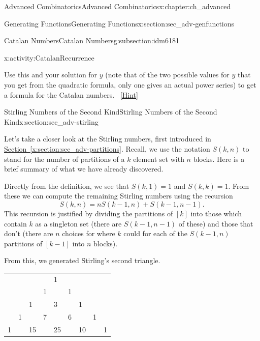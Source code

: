 \documentclass[oneside,10pt,]{book}
\numberwithin{equation}{chapter}
\begin{document}
\begin{chapterptx}{Advanced Combinatorics}{}{Advanced Combinatorics}{}{}{x:chapter:ch_advanced}
\begin{sectionptx}{Generating Functions}{}{Generating Functions}{}{}{x:section:sec_adv-genfunctions}
\begin{subsectionptx}{Catalan Numbers}{}{Catalan Numbers}{}{}{g:subsection:idm6181}
\begin{activity}{}{x:activity:CatalanRecurrence}
\begin{enumerate}[font=\bfseries,label=(\alph*),ref=\alph*]
\begin{equation*}
\end{equation*}
Use this and your solution for \(y\) (note that of the two possible values for \(y\) that you get from the quadratic formula, only one gives an actual power series) to get a formula for the Catalan numbers.%
\qquad~\hfill{\tiny\hyperlink{g:hint:idm6219-back}{[Hint]}}\end{enumerate}
\end{activity}
\end{subsectionptx}
\end{sectionptx}
%
%
\typeout{************************************************}
\typeout{************************************************}
%
\begin{sectionptx}{Stirling Numbers of the Second Kind}{}{Stirling Numbers of the Second Kind}{}{}{x:section:sec_adv-stirling}
\begin{introduction}{}%
Let's take a closer look at the Stirling numbers, first introduced in \hyperref[x:section:sec_adv-partitions]{Section~\ref{x:section:sec_adv-partitions}}.  Recall, we use the notation \(S(k,n)\) to stand for the number of partitions of a \(k\) element set with \(n\) blocks.  Here is a brief summary of what we have already discovered.%
\par
Directly from the definition, we see that \(S(k,1) = 1\) and \(S(k,k) = 1\).  From these we can compute the remaining Stirling numbers using the recursion%
\begin{equation*}
S(k,n) = nS(k-1,n) + S(k-1, n-1).
\end{equation*}
This recursion is justified by dividing the partitions of \([k]\) into those which contain \(k\) as a singleton set (there are \(S(k-1, n-1)\) of these) and those that don't (there are \(n\) choices for where \(k\) could for each of the \(S(k-1, n)\) partitions of \([k-1]\) into \(n\) blocks).%
\par
From this, we generated Stirling's second triangle.%
\begin{sidebyside}{1}{0.25}{0.25}{0}%
\begin{sbspanel}{0.5}%
{\centering%
\begin{tabular}{lllllllll}
&&&&1&&&&\tabularnewline[0pt]
&&&1&&1&&&\tabularnewline[0pt]
&&1&&3&&1&&\tabularnewline[0pt]
&1&&7&&6&&1&\tabularnewline[0pt]
1&&15&&25&&10&&1
\end{tabular}
\par}
\end{sbspanel}%

\end{sidebyside}
\end{introduction}
\end{sectionptx}
\end{chapterptx}
\end{document}
